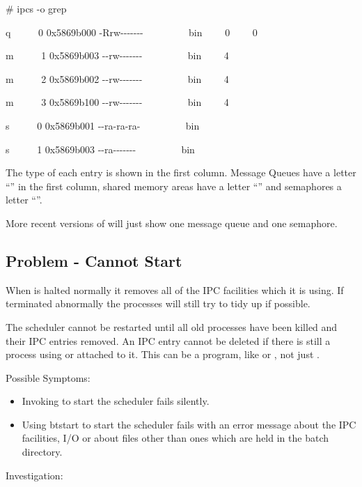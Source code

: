 \begin{expara}

\# ipcs -o {\textbar} grep \batchusername{}

\bigskip

q \ \ \ \ \ 0 0x5869b000 -Rrw-{}-{}-{}-{}-{}-{}- \ \ \ \batchusername{}
\ \ \ \ \ bin \ \ \ \ 0 \ \ \ \ 0

m \ \ \ \ \ 1 0x5869b003 -{}-rw-{}-{}-{}-{}-{}-{}- \ \ \ \batchusername{}
\ \ \ \ \ bin \ \ \ \ 4

m \ \ \ \ \ 2 0x5869b002 -{}-rw-{}-{}-{}-{}-{}-{}- \ \ \ \batchusername{}
\ \ \ \ \ bin \ \ \ \ 4

m \ \ \ \ \ 3 0x5869b100 -{}-rw-{}-{}-{}-{}-{}-{}- \ \ \ \batchusername{}
\ \ \ \ \ bin \ \ \ \ 4

s \ \ \ \ \ 0 0x5869b001 -{}-ra-ra-ra- \ \ \ \batchusername{} \ \ \ \ \ bin

s \ \ \ \ \ 1 0x5869b003 -{}-ra-{}-{}-{}-{}-{}-{}- \ \ \ \batchusername{}
\ \ \ \ \ bin

\end{expara}

The type of each entry is shown in the first column. Message Queues have a letter ``'' in the
first column, shared memory areas have a letter ``'' and semaphores a letter ``''.

More recent versions of \ProductName{} will just show one message queue and one semaphore.

\subsection{Problem - Cannot Start \ProductName{}}
When \ProductName{} is halted normally it removes all of the IPC facilities which it is using. If terminated abnormally the  processes will still try to tidy up if possible.

The scheduler cannot be restarted until all old \ProductName{} processes have been killed and their IPC entries removed. An IPC entry cannot be
deleted if there is still a process using or attached to it. This can be a program, like \PrBtq{} or
\PrBtjlist{}, not just .

Possible Symptoms:

\begin{itemize}
\item Invoking  to start the scheduler fails silently.
\item Using btstart to start the scheduler fails with an error message about the IPC facilities, I/O or about files other than ones which are
held in the batch directory.
\end{itemize}
Investigation:

